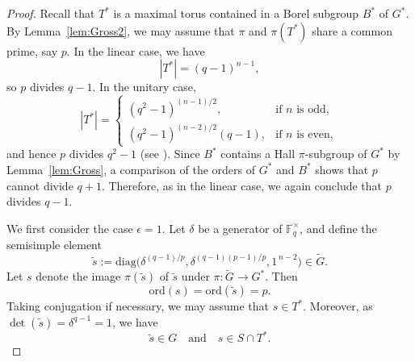 \documentclass[12pt]{amsart}
\theoremstyle{definition}
\numberwithin{equation}{section}
\newcommand{\ord}{{\mathrm {ord}}}
\newcommand{\diag}{{\mathrm {diag}}}
\newcommand{\FF}{{\mathbb F}}
\begin{document}
\begin{proof}
Recall that $T^*$ is a maximal torus contained in a Borel subgroup
$B^*$ of $G^*$. By Lemma~\ref{lem:Gross2}, we may assume that $\pi$
and $\pi(T^*)$ share a common prime, say $p$. In the linear case, we
have
\[
|T^*| = (q-1)^{n-1},
\]
so %
$p$ divides $q-1$. In the unitary %
case,
\[
|T^*| =
\begin{cases}
(q^2-1)^{(n-1)/2}, & \text{if $n$ is odd},\\[2pt]
(q^2-1)^{(n-2)/2}(q-1), & \text{if $n$ is even},
\end{cases}
\]
and %
hence $p$ divides $q^2-1$ (see \cite[p.~74]{Carter85}). Since
$B^*$ contains a Hall $\pi$-subgroup of $G^*$ by
Lemma~\ref{lem:Gross}, a comparison of the orders of $G^*$ and $B^*$
shows that $p$ cannot divide $q+1$. Therefore, as in the linear
case, we again conclude that $p$ divides $q-1$.



We first consider the case $\epsilon=1$. Let $\delta$ be a generator
of $\FF_{q}^\times$, and define the semisimple %
element
\[
\widetilde{s} := \diag\!\bigl( \delta^{(q-1)/p},
\delta^{(q-1)(p-1)/p}, 1^{\,n-2} \bigr) \in \widetilde{G}.
\]
Let %
$s$ denote the image $\pi(\widetilde{s})$ of $\widetilde{s}$
under $\pi:\widetilde{G}\to G^*$. %
Then
\[
\ord(s) = \ord(\widetilde{s}) = p.
\]
Taking %
conjugation if necessary, we may assume that $s\in T^*$.
Moreover, as $\det(\widetilde{s})=\delta^{q-1}=1$, we have
\[
\widetilde{s}\in G \quad\text{and}\quad s\in S\cap T^*.
\]


\end{proof}
\end{document}
